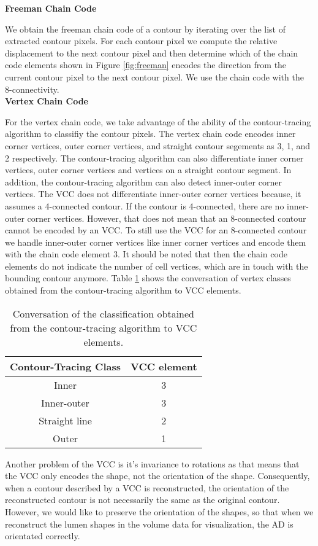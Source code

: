 \documentclass[thesis.tex]{subfiles}
\begin{document}
\textbf{Freeman Chain Code}

We obtain the freeman chain code of a contour by iterating over the list of extracted contour pixels. For each contour pixel we compute the relative displacement to the next contour pixel and then determine which of the chain code elements shown in Figure \ref{fig:freeman} encodes the direction from the current contour pixel to the next contour pixel. We use the chain code with the 8-connectivity. \\

\textbf{Vertex Chain Code}

For the vertex chain code, we take advantage of the ability of the contour-tracing algorithm to classifiy the contour pixels. The vertex chain code encodes inner corner vertices, outer corner vertices, and straight contour segements as 3, 1, and 2 respectively. The contour-tracing algorithm can also differentiate inner corner vertices, outer corner vertices and vertices on a straight contour segment. In addition, the contour-tracing algorithm can also detect inner-outer corner vertices. The VCC does not differentiate inner-outer corner vertices because, it assumes a 4-connected contour. If the contour is 4-connected, there are no inner-outer corner vertices. However, that does not mean that an 8-connected contour cannot be encoded by an VCC. To still use the VCC for an 8-connected contour we handle inner-outer corner vertices like inner corner vertices and encode them with the chain code element 3. It should be noted that then the chain code elements do not indicate the number of cell vertices, which are in touch with the bounding contour anymore. Table \ref{vcc_table}  shows the conversation of vertex classes obtained from the contour-tracing algorithm to VCC elements. 
\begin{table}[h!]
\centering
 \begin{tabular}{c c} 
 \toprule
 Contour-Tracing Class &  VCC element\\ [0.5ex] 
 \midrule
 Inner & 3 \\ 
 Inner-outer & 3 \\
 Straight line & 2 \\
 Outer & 1 \\
\bottomrule
\end{tabular}
\caption{Conversation of the classification obtained from the contour-tracing algorithm to VCC elements.}
\label{vcc_table}
\end{table}
 
Another problem of the VCC is it's invariance to rotations as that means that the VCC only encodes the shape, not the orientation of the shape. Consequently, when a contour described by a VCC is reconstructed, the orientation of the reconstructed contour is not necessarily the same as the original contour. However, we would like to preserve the orientation of the shapes, so that when we reconstruct the lumen shapes in the volume data for visualization, the AD is orientated correctly. 
\end{document}
